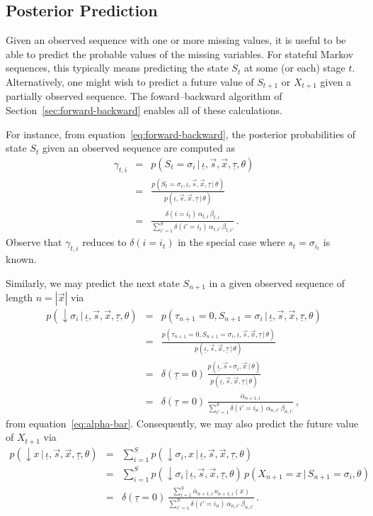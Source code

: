 \documentclass[a4paper]{article}
\newcommand{\dn}{\downarrow\!}
\newcommand{\ui}{\underline{\iota}}
\newcommand{\ut}{\underline{\tau}}
\begin{document}
\subsection{Posterior Prediction}

Given an observed sequence with one or more missing values, it is useful to be able to predict the probable values of the missing variables.
For stateful Markov sequences, this typically means predicting the state $S_t$ at some (or each) stage $t$.
Alternatively, one might wish to predict a future value of $S_{t+1}$ or $X_{t+1}$ given a partially observed sequence.
The foward--backward algorithm of Section~\ref{sec:forward-backward} enables all of these calculations.

For instance, from equation~\eqref{eq:forward-backward}, the posterior probabilities of state $S_t$ given an observed sequence are computed as
\begin{eqnarray}
   \gamma_{t,i} & = & p(S_t\!=\!\sigma_i\,|\,\ui,\vec{s},\vec{x},\ut,\theta)
\nonumber\\& = &
   \frac{p(S_t\!=\!\sigma_i,\ui,\vec{s},\vec{x},\ut\,|\,\theta)}
        {p(\ui,\vec{s},\vec{x},\ut\,|\,\theta)}
\nonumber\\& = &
   \frac{\delta(i=i_t)\,\alpha_{t,i}\,\beta_{t,i}}
        {\sum_{i'=1}^{S}\delta(i'=i_t)\,\alpha_{t,i'}\,\beta_{t,i'}}
\,.
\label{eq:gamma_t_i}
\end{eqnarray}
Observe that $\gamma_{t,i}$ reduces to $\delta(i=i_t)$ in the special case where $s_t=\sigma_{i_t}$ is known.

Similarly, we may predict the next state $S_{n+1}$ in a given observed sequence of length $n=|\vec{x}|$ via
\begin{eqnarray}
  p(\dn\sigma_i\,|\,\ui,\vec{s},\vec{x},\ut,\theta)  
& = &
  p(\tau_{n+1}\!=\!0,S_{n+1}\!=\!\sigma_i\,|\,\ui,\vec{s},\vec{x},\ut,\theta) 
\nonumber\\& = &
  \frac{p(\tau_{n+1}\!=\!0,S_{n+1}\!=\!\sigma_i,\ui,\vec{s},\vec{x},\ut\,|\,\theta)}
       {p(\ui,\vec{s},\vec{x},\ut\,|\,\theta)}
\nonumber\\& = & 
  \delta(\ut\!=\!0)\,
  \frac{p(\ui,\vec{s}\circ\sigma_i,\vec{x}\,|\,\theta)}
       {p(\ui,\vec{s},\vec{x},\ut\,|\,\theta)}
\nonumber\\& = & 
  \delta(\ut\!=\!0)\,
  \frac{\bar{\alpha}_{n+1,i}}
       {\sum_{i'=1}^S\delta(i'\!=\!i_n)\,\alpha_{n,i'}\,\beta_{n,i'}}
\,,
\end{eqnarray}
from equation~\eqref{eq:alpha-bar}.
Consequently, we may also predict the future value of $X_{t+1}$ via
\begin{eqnarray}
  p(\dn x\,|\,\ui,\vec{s},\vec{x},\ut,\theta)  
& = &
\sum_{i=1}^{S}p(\dn \sigma_i,x\,|\,\ui,\vec{s},\vec{x},\ut,\theta) 
\nonumber\\& = &
\sum_{i=1}^{S}p(\dn \sigma_i\,|\,\ui,\vec{s},\vec{x},\ut,\theta)\,p(X_{n+1}\!=\!x\,|\,S_{n+1}\!=\!\sigma_i,\theta)
\nonumber\\& = &
  \delta(\ut\!=\!0)\,
  \frac{\sum_{i=1}^{S}\bar{\alpha}_{n+1,i}\,o_{n+1,i}(x)}
       {\sum_{i'=1}^S\delta(i'\!=\!i_n)\,\alpha_{n,i'}\,\beta_{n,i'}}\,.
\end{eqnarray}
\end{document}
